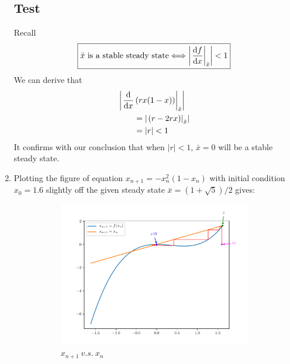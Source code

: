 \begin{homeworkProblem}[2]
\begin{enumerate}
\subsection{Test}
Recall \[
    \boxed{
    \bar x \text{ is a stable steady state}
    \Longleftrightarrow
    \left| \left.\frac{\mathrm{d}f}{\mathrm{d}x}\right|_{\bar x} \right| < 1
    }
\]
We can derive that
\[
    \begin{aligned}
        &\left|\left.\frac{\mathrm{d}}{\mathrm{d}x} \left(rx(1-x)\right)\right|_{\bar x}\right|\\
        &\qquad = \left| \left.(r - 2rx)\right|_{\bar x} \right|\\
        &\qquad = |r| < 1
    \end{aligned}
\]
It confirms with our conclusion that when $|r| < 1$, $\bar x = 0$ will be a
stable steady state.
\pagebreak
\item Plotting the figure of equation $x_{n+1} = -x_n^2(1-x_n)$ with initial
condition $x_0 = 1.6$ slightly off the given steady state $\bar x = (1+ \sqrt{5}
)/2$ gives:
\begin{figure}[h]
    \centering
    \begin{subfigure}[t]{0.4\linewidth}
        \centering
        \includegraphics[scale=0.5]{fig/fig2(b)_cob.pdf}
        \caption{$x_{n+1}\ v.s.\ x_n$}
    \end{subfigure}
    \hfill
    \begin{subfigure}[t]{0.4\linewidth}
        \centering

\end{subfigure}
\end{figure}
\end{enumerate}
\end{homeworkProblem}

